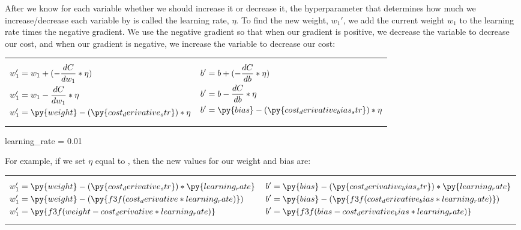 \documentclass[12pt, demo]{article}
\begin{document}
After we know for each variable whether we should increase it or decrease it, the hyperparameter that determines how much we increase/decrease each variable by is called the learning rate, $\eta$. To find the new weight, $w_1'$, we add the current weight $w_1$ to the learning rate times the negative gradient. We use the negative gradient so that when our gradient is positive, we decrease the variable to decrease our cost, and when our gradient is negative, we increase the variable to decrease our cost:
{
\setlength{\abovedisplayskip}{0pt}
\setlength{\belowdisplayskip}{0pt}
\begin{center}
	\noindent\begin{tabularx}{0.8\linewidth}{X X}
		\vbox{
			\begin{align*}
				w_1' & = w_1 + (-\frac{dC}{dw_1} * \eta)
				\\
				w_1' & = w_1 - \frac{dC}{dw_1} * \eta
				\\
				w_1' & = \py{weight} - (\py{cost_derivative_str}) * \eta
			\end{align*}
		}
		 &
		\vbox{
			\begin{align*}
				b' & = b + (-\frac{dC}{db} * \eta)
				\\
				b' & = b - \frac{dC}{db} * \eta
				\\
				b' & = \py{bias} - (\py{cost_derivative_bias_str}) * \eta
			\end{align*}
		}
	\end{tabularx}
\end{center}
}

\begin{pycode}
learning_rate = 0.01
\end{pycode}

{
\setlength{\abovedisplayskip}{0pt}
\setlength{\belowdisplayskip}{0pt}
For example, if we set $\eta$ equal to , then the new values for our weight and bias are:
\begin{center}
	\begin{tabularx}{0.8\linewidth}{X X}
		\vbox{
			\begin{align*}
				w_1' & = \py{weight} - (\py{cost_derivative_str}) * \py{learning_rate}
				\\
				w_1' & = \py{weight} - (\py{f3f(cost_derivative * learning_rate)})
				\\
				w_1' & = \py{f3f(weight - cost_derivative * learning_rate)}
			\end{align*}
		} &
		\vbox{
			\begin{align*}
				b' & = \py{bias} - (\py{cost_derivative_bias_str}) * \py{learning_rate}
				\\
				b' & = \py{bias} - (\py{f3f(cost_derivative_bias * learning_rate)})
				\\
				b' & = \py{f3f(bias - cost_derivative_bias * learning_rate)}
			\end{align*}
		}
	\end{tabularx}
\end{center}
}
\end{document}
